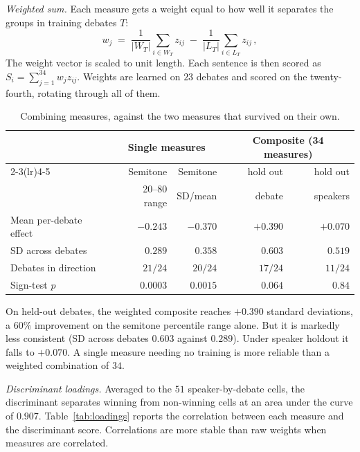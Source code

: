 \documentclass[pdflatex,sn-mathphys-num]{sn-jnl}%
\begin{document}
\begin{appendices}
\emph{Weighted sum.} Each measure gets a weight equal to how well it
separates the groups in training debates $T$:
\begin{equation}
w_j \;=\; \frac{1}{|W_T|}\sum_{i \in W_T} z_{ij} \;-\;
          \frac{1}{|L_T|}\sum_{i \in L_T} z_{ij} \,,
\label{eq:weights}
\end{equation}
The weight vector is scaled to unit length. Each sentence is then scored
as $S_i = \sum_{j=1}^{34} w_j z_{ij}$. Weights are learned on $23$ debates
and scored on the twenty-fourth, rotating through all of them.

\begin{table}[h]
\caption{Combining measures, against the two measures that survived on their
own.}
\label{tab:combine}
\centering
\scriptsize
\setlength{\tabcolsep}{2.5pt}
\begin{tabular}{lrrrr}
\toprule
 & \multicolumn{2}{c}{Single measures} & \multicolumn{2}{c}{Composite (34 measures)} \\
\cmidrule(lr){2-3}\cmidrule(lr){4-5}
 & Semitone & Semitone & hold out & hold out \\
 & 20--80 range & SD/mean & debate & speakers \\
\midrule
Mean per-debate effect & $-0.243$ & $\mathbf{-0.370}$ & $+0.390$ & $+0.070$ \\
SD across debates      & $0.289$  & $0.358$  & $0.603$ & $0.519$ \\
Debates in direction   & $21/24$  & $20/24$  & $17/24$ & $11/24$ \\
Sign-test $p$          & $0.0003$ & $0.0015$ & $0.064$ & $0.84$ \\
\bottomrule
\end{tabular}
\end{table}

On held-out debates, the weighted composite reaches $+0.390$ standard
deviations, a $60\%$ improvement on the semitone percentile range alone.
But it is markedly less consistent (SD across debates $0.603$ against
$0.289$). Under speaker holdout it falls to $+0.070$. A single measure
needing no training is more reliable than a weighted combination of $34$.

\emph{Discriminant loadings.} Averaged to the $51$ speaker-by-debate cells,
the discriminant separates winning from non-winning cells at an area under
the curve of $0.907$. Table~\ref{tab:loadings} reports the correlation
between each measure and the discriminant score. Correlations are more
stable than raw weights when measures are correlated.


\end{appendices}
\end{document}
